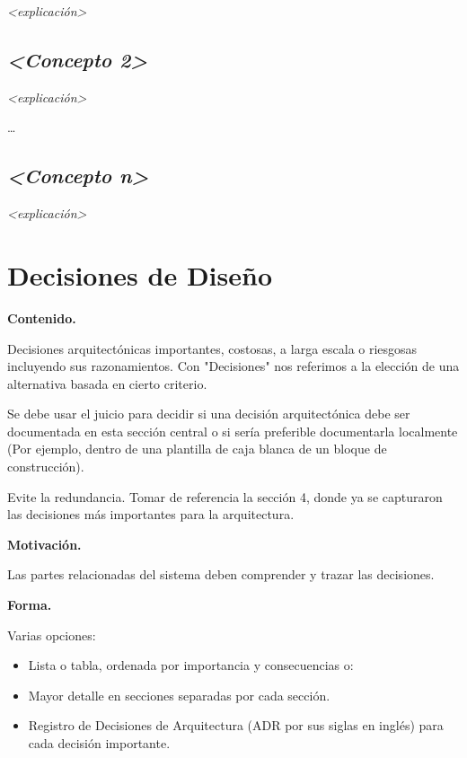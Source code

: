 \documentclass[]{article}
\begin{document}
\emph{\textless{}explicación\textgreater{}}

\hypertarget{__emphasis_concepto_2_emphasis}{%
\subsection{\texorpdfstring{\emph{\textless{}Concepto
2\textgreater{}}}{\textless{}Concepto 2\textgreater{}}}\label{__emphasis_concepto_2_emphasis}}

\emph{\textless{}explicación\textgreater{}}

\ldots{}

\hypertarget{__emphasis_concepto_n_emphasis}{%
\subsection{\texorpdfstring{\emph{\textless{}Concepto
n\textgreater{}}}{\textless{}Concepto n\textgreater{}}}\label{__emphasis_concepto_n_emphasis}}

\emph{\textless{}explicación\textgreater{}}

\hypertarget{section-design-decisions}{%
\section{Decisiones de Diseño}\label{section-design-decisions}}

\textbf{Contenido.}

Decisiones arquitectónicas importantes, costosas, a larga escala o
riesgosas incluyendo sus razonamientos. Con "Decisiones" nos referimos a
la elección de una alternativa basada en cierto criterio.

Se debe usar el juicio para decidir si una decisión arquitectónica debe
ser documentada en esta sección central o si sería preferible
documentarla localmente (Por ejemplo, dentro de una plantilla de caja
blanca de un bloque de construcción).

Evite la redundancia. Tomar de referencia la sección 4, donde ya se
capturaron las decisiones más importantes para la arquitectura.

\textbf{Motivación.}

Las partes relacionadas del sistema deben comprender y trazar las
decisiones.

\textbf{Forma.}

Varias opciones:

\begin{itemize}
\item
  Lista o tabla, ordenada por importancia y consecuencias o:
\item
  Mayor detalle en secciones separadas por cada sección.
\item
  Registro de Decisiones de Arquitectura (ADR por sus siglas en inglés)
  para cada decisión importante.
\end{itemize}
\end{document}

